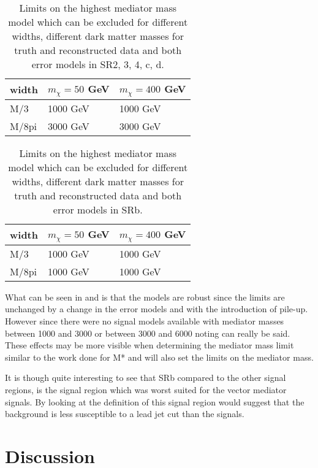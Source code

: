 \begin{table}[ht]
\begin{center}
\begin{tabular}{|l|l|l|}
\hline
width & $m_{\chi}=50$ GeV & $m_{\chi}=400$ GeV \\ \hline
M/3 & 1000 GeV & 1000 GeV \\ \hline
M/8pi & 3000 GeV & 3000 GeV\\ \hline
\end{tabular}
\caption{Limits on the highest mediator mass model which can be excluded for different widths, different dark matter masses for truth and reconstructed data and both error models in SR2, 3, 4, c, d.}
\label{tab:mediatorpass}
\end{center}
\end{table}
\begin{table}[ht]
\begin{center}
\begin{tabular}{|l|l|l|}
\hline
width & $m_{\chi}=50$ GeV & $m_{\chi}=400$ GeV \\ \hline
M/3 & 1000 GeV & 1000 GeV\\ \hline
M/8pi & 1000 GeV & 1000 GeV\\ \hline
\end{tabular}
\caption{Limits on the highest mediator mass model which can be excluded for different widths, different dark matter masses for truth and reconstructed data and both error models in SRb.}
\label{tab:mediatorpass2}
\end{center}
\end{table}

What can be seen in  and  is that the models are robust since the limits are unchanged by a change in the error models and with the introduction of pile-up. However since there were no signal models available with mediator masses between 1000 and 3000 or between 3000 and 6000 noting can really be said. These effects may be more visible when determining the mediator mass limit similar to the work done for M* and will also set the limits on the mediator mass. 

It is though quite interesting to see that SRb compared to the other signal regions, is the signal region which was worst suited for the vector mediator signals. By looking at the definition of this signal region would suggest that the background is less susceptible to a lead jet cut than the signals.

\newpage
\section{Discussion}
